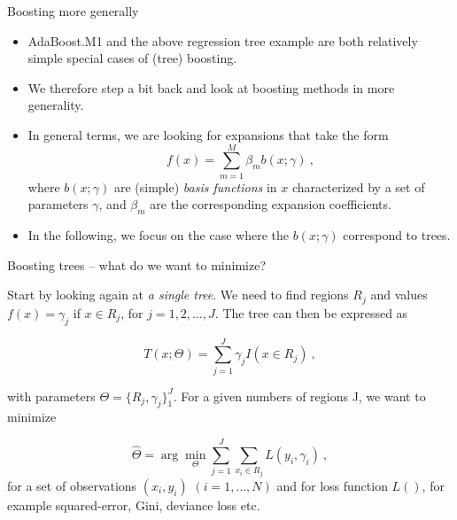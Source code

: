 \documentclass[
  10pt,
  ignorenonframetext,
]{beamer}
\providecommand{\tightlist}{%
  \setlength{\itemsep}{0pt}\setlength{\parskip}{0pt}}
\begin{document}
\begin{frame}{Boosting more generally}
\label{boosting-more-generally}
\(~\)

\begin{itemize}
\tightlist
\item
  AdaBoost.M1 and the above regression tree example are both relatively
  simple special cases of (tree) boosting.
\end{itemize}

\vspace{2mm}

\begin{itemize}
\tightlist
\item
  We therefore step a bit back and look at boosting methods in more
  generality.
\end{itemize}

\vspace{2mm}

\begin{itemize}
\tightlist
\item
  In general terms, we are looking for expansions that take the form
  \[f(x) = \sum_{m=1}^M \beta_m b(x;\gamma) \ , \] where \(b(x;\gamma)\)
  are (simple) \emph{basis functions} in \(x\) characterized by a set of
  parameters \(\gamma\), and \(\beta_m\) are the corresponding expansion
  coefficients.
\end{itemize}

\vspace{2mm}

\begin{itemize}
\tightlist
\item
  In the following, we focus on the case where the \(b(x;\gamma)\)
  correspond to trees.
\end{itemize}
\end{frame}

\begin{frame}
\begin{block}{Boosting trees -- what do we want to minimize?}
\label{boosting-trees-what-do-we-want-to-minimize}
\(~\)

Start by looking again at \emph{a single tree}. We need to find regions
\(R_j\) and values \(f(x)=\gamma_j\) if \(x\in R_j\), for
\(j=1,2,\ldots,J\). The tree can then be expressed as

\begin{equation*} 
T(x;\Theta) = \sum_{j=1}^J \gamma_j I(x\in R_j) \ ,
\end{equation*}

with parameters \(\Theta=\{R_j,\gamma_j\}_1^J\). For a given numbers of
regions J, we want to minimize

\begin{equation}\label{eq:treeopt}
\hat\Theta = \arg \min_\Theta \sum_{j=1}^J \sum_{x_i \in R_j} L(y_i,\gamma_i) \ , 
\end{equation} for a set of observations \((x_i,y_i)\)
\((i=1,\ldots,N)\) and for loss function \(L()\), for example
squared-error, Gini, deviance loss etc.
\end{block}
\end{frame}
\end{document}
